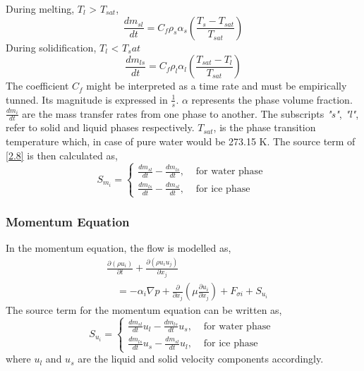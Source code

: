 \noindent During melting, $T_l$ > $T_{sat}$,
\begin{equation}
	\frac{d m_{s l}}{d t}=C_{f} \rho_{s} \alpha_{s}\left(\frac{T_{s}-T_{s a t}}{T_{s a t}}\right)
	\label{2.9}
\end{equation}
During solidification, $T_l$ < $T_sat$
\begin{equation}
	\label{2.10}
	\frac{d m_{l s}}{d t}=C_{f} \rho_{l} \alpha_{l}\left(\frac{T_{s a t}-T_{l}}{T_{s a t}}\right)
\end{equation}
The coefficient $C_f$ might be interpreted as a time rate and must be empirically tunned. Its magnitude is expressed in $\frac{1}{s}$. $\alpha$ represents the phase volume fraction. $\frac{d m_{i}}{d t}$ are the mass transfer rates from one phase to another. The subscripts \textit{"s"}, \textit{"l"}, refer to solid and liquid phases respectively. \textit{$T_{sat}$}, is the phase transition temperature which, in case of pure water would be 273.15 K.
The source term of \ref{2.8} is then calculated as,
\begin{equation}
	\label{2.11}
	S_{m_{i}}=\left\{\begin{array}{lr}
	\frac{d m_{s l}}{d t}-\frac{d m_{l s}}{d t}, & \text { for water phase } \\
	\frac{d m_{l s}}{d t}-\frac{d m_{s l}}{d t}, & \text { for ice phase }
	\end{array}\right.
\end{equation}  

\subsubsection{Momentum Equation}

\setlength{\parindent}{0.5cm} In the momentum equation, the flow is modelled as,
\begin{equation}
	\label{2.12}
	\begin{aligned}
	&\frac{\partial\left(\rho {u}_{i}\right)}{\partial t}+\frac{\partial\left(\rho {u}_{i} {u}_{j}\right)}{\partial x_{j}} \\
	&\quad=-\alpha_{i} \nabla p+\frac{\partial}{\partial x_{j}}\left(\mu \frac{\partial {u}_{i}}{\partial x_{j}}\right)+F_{\sigma i}+S_{u_{i}}
	\end{aligned}
\end{equation}
The source term for the momentum equation can be written as,
\begin{equation}
	\label{2.13}
	S_{u_{i}}=\left\{\begin{array}{cr}
	\frac{d m_{s l}}{d t} \textbf{$u_{l}$}-\frac{d m_{l s}}{d t} \textbf{$u_{s},$} & \text { for water phase } \\
	\frac{d m_{l s}}{d t} \textbf{$u_{s}$}-\frac{d m_{s l}}{d t} \textbf{$u_{l}$}, & \text { for ice phase }
	\end{array}\right.
\end{equation}
where \textbf{$u_{l}$} and \textbf{$u_{s}$} are the liquid and solid velocity components accordingly. 

